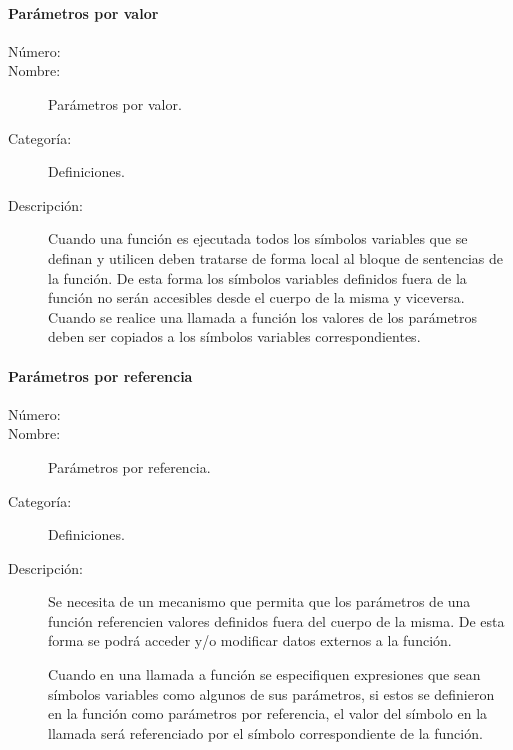 \paragraph{Parámetros por valor}
	\begin{description}
		\item [Número:] \cn
		\item [Nombre:] Parámetros por valor.
		\item [Categoría:] Definiciones.
		\item [Descripción:] Cuando una función es ejecutada todos los símbolos variables que se definan y utilicen deben tratarse de forma 
		local al bloque de sentencias de la función. De esta forma los símbolos variables definidos fuera de la función no serán accesibles
		desde el cuerpo de la misma y viceversa. Cuando se realice una llamada a función los valores de los parámetros deben ser copiados
		a los símbolos variables correspondientes.
	\end{description}

\paragraph{Parámetros por referencia}
	\begin{description}
		\item [Número:] \cn
		\item [Nombre:] Parámetros por referencia.
		\item [Categoría:] Definiciones.
		\item [Descripción:] Se necesita de un mecanismo que permita que los parámetros de una función referencien valores definidos 
		fuera del cuerpo de la misma. De esta forma se podrá acceder y/o modificar datos externos a la función. 
		
		Cuando en una llamada a función se especifiquen expresiones que sean símbolos variables como algunos de sus parámetros, si estos se definieron en la
		función como parámetros por referencia, el valor del símbolo en la llamada será referenciado por el símbolo correspondiente de la función.
	\end{description}

